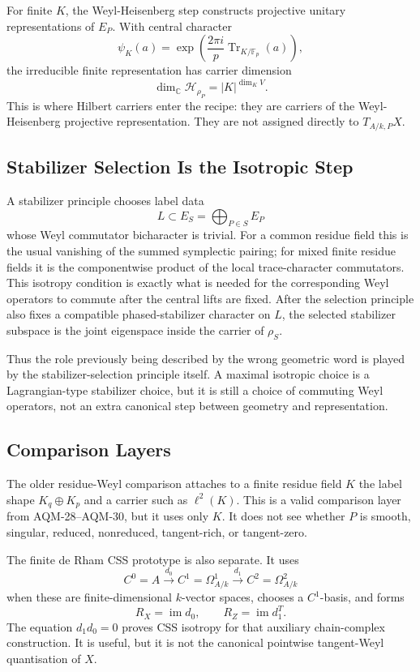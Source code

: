 For finite \(K\), the Weyl-Heisenberg step constructs projective unitary
representations of \(E_P\).  With central character
\[
  \psi_K(a)=\exp\!\left(\frac{2\pi i}{p}
    \operatorname{Tr}_{K/\mathbb F_p}(a)\right),
\]
the irreducible finite representation has carrier dimension
\[
  \dim_{\mathbb C}\mathcal H_{\rho_P}=|K|^{\dim_K V}.
\]
This is where Hilbert carriers enter the recipe: they are carriers of the
Weyl-Heisenberg projective representation.  They are not assigned directly to
\(T_{A/k,P}X\).

\subsection{Stabilizer Selection Is the Isotropic Step}

A stabilizer principle chooses label data
\[
  L\subset E_S=\bigoplus_{P\in S}E_P
\]
whose Weyl commutator bicharacter is trivial.  For a common residue field this
is the usual vanishing of the summed symplectic pairing; for mixed finite
residue fields it is the componentwise product of the local trace-character
commutators.  This isotropy condition is exactly what is needed for the
corresponding Weyl operators to commute after the central lifts are fixed.
After the selection principle also fixes a compatible phased-stabilizer
character on \(L\), the selected stabilizer subspace is the joint eigenspace
inside the carrier of \(\rho_S\).

Thus the role previously being described by the wrong geometric word is played
by the stabilizer-selection principle itself.  A maximal isotropic choice is a
Lagrangian-type stabilizer choice, but it is still a choice of commuting Weyl
operators, not an extra canonical step between geometry and representation.

\subsection{Comparison Layers}

The older residue-Weyl comparison attaches to a finite residue field \(K\) the
label shape \(K_q\oplus K_p\) and a carrier such as \(\ell^2(K)\).  This is a
valid comparison layer from AQM-28--AQM-30, but it uses only \(K\).  It does
not see whether \(P\) is smooth, singular, reduced, nonreduced, tangent-rich, or
tangent-zero.

The finite de Rham CSS prototype is also separate.  It uses
\[
  C^0=A\xrightarrow{d_0}C^1=\Omega^1_{A/k}
       \xrightarrow{d_1}C^2=\Omega^2_{A/k}
\]
when these are finite-dimensional \(k\)-vector spaces, chooses a \(C^1\)-basis,
and forms
\[
  R_X=\operatorname{im}d_0,\qquad R_Z=\operatorname{im}d_1^T.
\]
The equation \(d_1d_0=0\) proves CSS isotropy for that auxiliary
chain-complex construction.  It is useful, but it is not the canonical
pointwise tangent-Weyl quantisation of \(X\).

